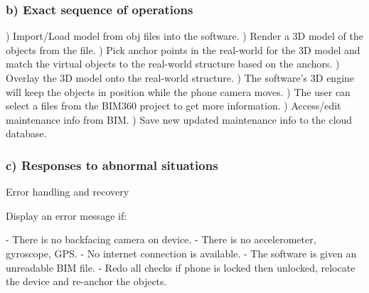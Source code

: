 \documentclass[onecolumn, draftclsnofoot,10pt, compsoc]{IEEEtran}
\begin{document}
        \subsubsection*{b) Exact sequence of operations} 
            \hangindent=10mm) Import/Load model from obj files into the software. ) Render a 3D model of the objects from the file. ) Pick anchor points in the real-world for the 3D model and match the virtual objects to the real-world structure based on the anchors. ) Overlay the 3D model onto the real-world structure. ) The software's 3D engine will keep the objects in position while the phone camera moves. ) The user can select a files from the BIM360 project to get more information. ) Access/edit maintenance info from BIM. ) Save new updated maintenance info to the cloud database. \par
        \subsubsection*{c) Responses to abnormal situations}
            \hangindent=10mm\noindent
            Error handling and recovery \par
            \hangindent=15mm\noindent
            Display an error message if: \par
            \hangindent=20mm\noindent
                    - There is no backfacing camera on device. \newline
                    - There is no accelerometer, gyroscope, GPS. \newline
                    - No internet connection is available. \newline
                    - The software is given an unreadable BIM file. \newline
                    - Redo all checks if phone is locked then unlocked, relocate the device and re-anchor the objects. \newline
             \par
\end{document}
